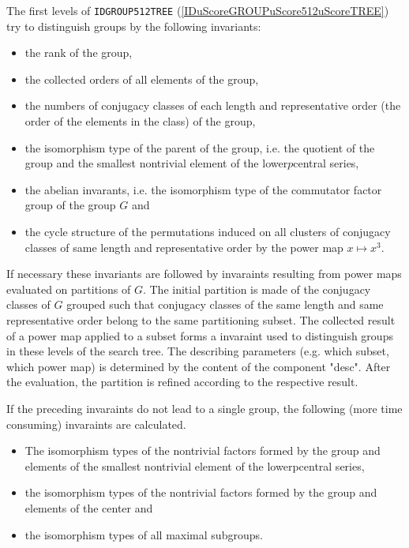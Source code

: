 \documentclass[a4paper,11pt]{report}
\begin{document}
{{ The first levels of \texttt{ID{\textunderscore}GROUP{\textunderscore}512{\textunderscore}TREE} (\ref{IDuScoreGROUPuScore512uScoreTREE}) try to distinguish groups by the following invariants: 
\begin{itemize}
\item  the rank of the group, 
\item  the collected orders of all elements of the group, 
\item  the numbers of conjugacy classes of each length and representative order (the
order of the elements in the class) of the group, 
\item  the isomorphism type of the parent of the group, i.e. the quotient of the
group and the smallest non\texttt{}trivial element of the
lower\texttt{}$p$\texttt{}central series, 
\item  the abelian invarants, i.e. the isomorphism type of the commutator factor
group of the group $G$ and 
\item  the cycle structure of the permutations induced on all clusters of conjugacy
classes of same length and representative order by the power map $x\mapsto x^3$. 
\end{itemize}
 

 If necessary these invariants are followed by invaraints resulting from power
maps evaluated on partitions of $G$. The initial partition is made of the conjugacy classes of $G$ grouped such that conjugacy classes of the same length and same representative
order belong to the same partitioning subset. The collected result of a power
map applied to a subset forms a invaraint used to distinguish groups in these
levels of the search tree. The describing parameters (e.g. which subset, which
power map) is determined by the content of the component "desc". After the
evaluation, the partition is refined according to the respective result. 

 If the preceding invaraints do not lead to a single group, the following (more
time consuming) invaraints are calculated. 
\begin{itemize}
\item  The isomorphism types of the non\texttt{}trivial factors formed by
the group and elements of the smallest non\texttt{}trivial element
of the lower\texttt{}p\texttt{}central series, 
\item  the isomorphism types of the non\texttt{}trivial factors formed by
the group and elements of the center and 
\item  the isomorphism types of all maximal subgroups. 
\end{itemize}
 

}}
\end{document}
